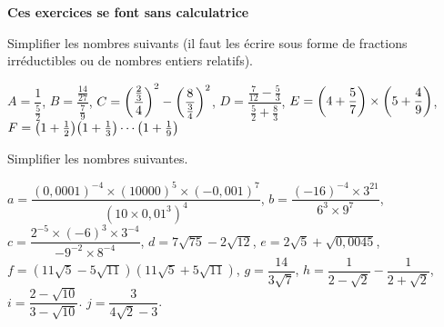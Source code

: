 %
\begin{center}
\bfseries \Large 
Ces exercices se font sans calculatrice
\end{center}
%
%
\begin{exr} Simplifier les nombres suivants (il faut les écrire sous forme de fractions irréductibles ou de nombres entiers relatifs).

$A=\dfrac1{\frac52}$, \hfill
$B=\dfrac{\frac{14}{27}}{\frac{7}{9}}$, \hfill
$C=\mleft(\dfrac{\frac23}{4}\mright)^2-\mleft(\dfrac{8}{\frac34}\mright)^2$, \hfill
$D=\dfrac{\frac7{12}-\frac53}{\frac52+\frac83}$, \hfill
$E=\mleft(4+\dfrac{5}{7}\mright)\times\mleft(5+\dfrac{4}{9}\mright)$, \hfill
$F=\mleft(1+\frac12\mright)\mleft(1+\frac13\mright)\cdots\mleft(1+\frac19\mright)$

\end{exr}
%
%
\begin{exr} Simplifier les nombres suivantes.

$a=\dfrac{(0,0001)^{-4}\times(10000)^5\times(-0,001)^7}{(10\times  0,01^3)^4}$, \hfill
$b=\dfrac{(-16)^{-4}\times  3^{21}}{6^3\times  9^7}$, \hfill
$c=\dfrac{2^{-5}\times  (-6)^3\times  3^{-4}}{-9^{-2}\times  8^{-4}}$, \hfill
$d=7\sqrt{75}-2\sqrt{12}$, \hfill
$e=2\sqrt{5}+\sqrt{0,0045}$, \hfill
$f=\left( 11\sqrt{5}-5\sqrt{11}\right)\left( 11\sqrt{5}+5\sqrt{11}\right)$, \hfill
$g=\dfrac{14}{3\sqrt{7}}$, \hfill
$h=\dfrac{1}{2-\sqrt2}-\dfrac{1}{2+\sqrt2}$, \hfill
$i=\dfrac{2-\sqrt{10}}{3-\sqrt{10}}$.
$j=\dfrac{3}{4\sqrt{2}-3}$.
\end{exr}
